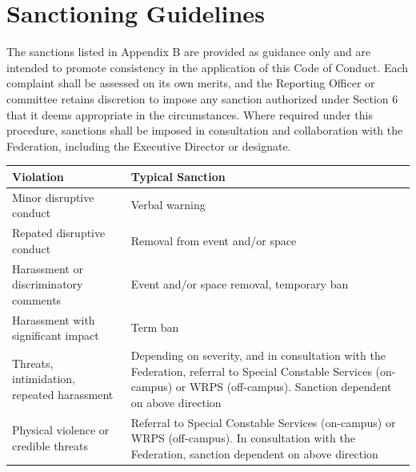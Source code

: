 \section{Sanctioning Guidelines}

The sanctions listed in Appendix B are provided as guidance only and are intended to promote consistency in the application of this Code of Conduct. Each complaint shall be assessed on its own merits, and the Reporting Officer or committee retains discretion to impose any sanction authorized under Section 6 that it deems appropriate in the circumstances. Where required under this procedure, sanctions shall be imposed in consultation and collaboration with the Federation, including the Executive Director or designate.

\begin{center}
	\begin{tabularx}{\textwidth}{| X | X |}
		\hline
		\rowcolor{lightgray} \textbf{Violation} & \textbf{Typical Sanction}  \\ 
		\hline
		Minor disruptive conduct & Verbal warning \\  
		\hline
		Repated disruptive conduct & Removal from event and/or space \\
		\hline
		Harassment or discriminatory comments & Event and/or space removal, temporary ban \\
		\hline 
		Harassment with significant impact & Term ban \\
		\hline
		Threats, intimidation, repeated harassment & Depending on severity, and in consultation with the Federation, referral to Special Constable Services (on-campus) or WRPS (off-campus). Sanction dependent on above direction \\
		\hline
		Physical violence or credible threats & Referral to Special Constable Services (on-campus) or WRPS (off-campus). In consultation with the Federation, sanction dependent on above direction \\
		\hline
	\end{tabularx}
\end{center}